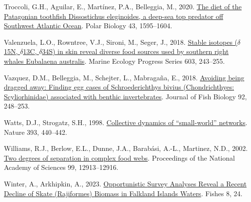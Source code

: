 \documentclass[
]{article}
\newlength{\cslhangindent}
\newenvironment{CSLReferences}[2] %
 {\begin{list}{}{%
  \setlength{\itemindent}{0pt}
  \setlength{\leftmargin}{0pt}
  \setlength{\parsep}{0pt}
  \ifodd #1
   \setlength{\leftmargin}{\cslhangindent}
   \setlength{\itemindent}{-1\cslhangindent}
  \fi
  \setlength{\itemsep}{#2\baselineskip}}}
 {\end{list}}
\begin{document}
\begin{CSLReferences}{1}{0}
Troccoli, G.H., Aguilar, E., Martínez, P.A., Belleggia, M., 2020.
\href{https://doi.org/10.1007/s00300-020-02730-2}{The diet of the
{Patagonian} toothfish {Dissostichus} eleginoides, a deep-sea top
predator off {Southwest Atlantic Ocean}}. Polar Biology 43, 1595--1604.

Valenzuela, L.O., Rowntree, V.J., Sironi, M., Seger, J., 2018.
\href{https://doi.org/10.3354/meps12722}{Stable isotopes
({\(\delta\)15N}, {\(\delta\)13C}, {\(\delta\)34S}) in skin reveal
diverse food sources used by southern right whales {Eubalaena}
australis}. Marine Ecology Progress Series 603, 243--255.

Vazquez, D.M., Belleggia, M., Schejter, L., Mabragaña, E., 2018.
\href{https://doi.org/10.1111/jfb.13490}{Avoiding being dragged away:
Finding egg cases of {Schroederichthys} bivius ({Chondrichthyes}:
{Scyliorhinidae}) associated with benthic invertebrates}. Journal of
Fish Biology 92, 248--253.

Watts, D.J., Strogatz, S.H., 1998.
\href{https://doi.org/10.1038/30918}{Collective dynamics of
{``small-world''} networks}. Nature 393, 440--442.

Williams, R.J., Berlow, E.L., Dunne, J.A., Barabási, A.-L., Martinez,
N.D., 2002. \href{https://doi.org/10.1073/pnas.192448799}{Two degrees of
separation in complex food webs}. Proceedings of the National Academy of
Sciences 99, 12913--12916.

Winter, A., Arkhipkin, A., 2023.
\href{https://doi.org/10.3390/fishes8010024}{Opportunistic {Survey
Analyses Reveal} a {Recent Decline} of {Skate} ({Rajiformes}) {Biomass}
in {Falkland Islands Waters}}. Fishes 8, 24.

\end{CSLReferences}
\end{document}
